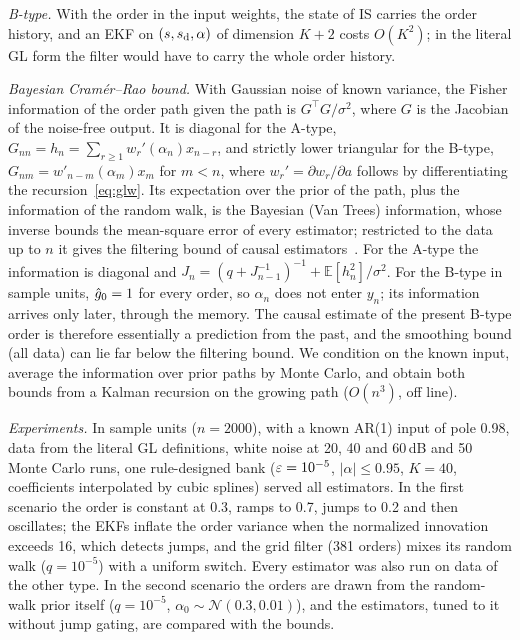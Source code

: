 \emph{B-type.} With the order in the input weights, the state of IS carries the order history, and an EKF on $(s,s_{\mathrm{d}},\alpha)$ of dimension $K+2$ costs $O(K^2)$; in the literal GL form the filter would have to carry the whole order history.

\emph{Bayesian Cram\'er--Rao bound.} With Gaussian noise of known variance, the Fisher information of the order path given the path is $G^{\top}G/\sigma^2$, where $G$ is the Jacobian of the noise-free output. It is diagonal for the A-type, $G_{nn}=h_n=\sum_{r\ge1}w_r'(\alpha_n)x_{n-r}$, and strictly lower triangular for the B-type, $G_{nm}=w'_{n-m}(\alpha_m)x_m$ for $m<n$, where $w_r'=\partial w_r/\partial a$ follows by differentiating the recursion~\eqref{eq:glw}. Its expectation over the prior of the path, plus the information of the random walk, is the Bayesian (Van Trees) information, whose inverse bounds the mean-square error of every estimator; restricted to the data up to $n$ it gives the filtering bound of causal estimators~\cite{tichavsky1998}. For the A-type the information is diagonal and $J_n=(q+J_{n-1}^{-1})^{-1}+\mathbb E[h_n^2]/\sigma^2$. For the B-type in sample units, $\hat g_0=1$ for every order, so $\alpha_n$ does not enter $y_n$; its information arrives only later, through the memory. The causal estimate of the present B-type order is therefore essentially a prediction from the past, and the smoothing bound (all data) can lie far below the filtering bound. We condition on the known input, average the information over prior paths by Monte Carlo, and obtain both bounds from a Kalman recursion on the growing path ($O(n^3)$, off line).

\emph{Experiments.} In sample units ($n=2000$), with a known AR(1) input of pole 0.98, data from the literal GL definitions, white noise at 20, 40 and 60\,dB and 50 Monte Carlo runs, one rule-designed bank ($\varepsilon=10^{-5}$, $|\alpha|\le0.95$, $K=40$, coefficients interpolated by cubic splines) served all estimators. In the first scenario the order is constant at 0.3, ramps to 0.7, jumps to 0.2 and then oscillates; the EKFs inflate the order variance when the normalized innovation exceeds 16, which detects jumps, and the grid filter (381 orders) mixes its random walk ($q=10^{-5}$) with a uniform switch. Every estimator was also run on data of the other type. In the second scenario the orders are drawn from the random-walk prior itself ($q=10^{-5}$, $\alpha_0\sim\mathcal N(0.3,0.01)$), and the estimators, tuned to it without jump gating, are compared with the bounds.

